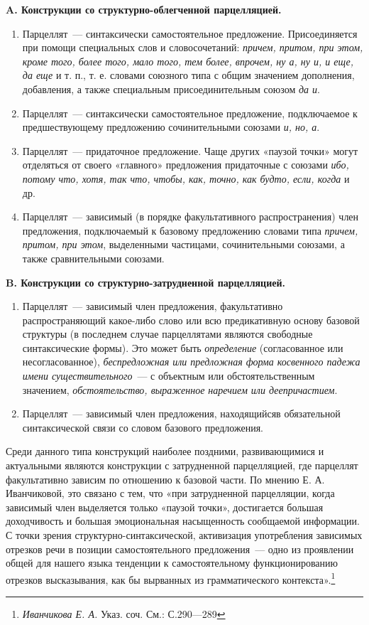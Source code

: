 \documentclass{kursa4}
\begin{document}
{      {\centering
      \textbf{A. Конструкции со структурно-облегченной парцелляцией.}}
      \begin{enumerate}
        \item Парцеллят~--- синтаксически самостоятельное предложение. Присоединяется при помощи специальных слов и словосочетаний: \textit{причем, притом, при этом, кроме того, более того, мало того, тем более, впрочем, ну а, ну и, и еще, да еще} и т. п., т. е. словами союзного типа с общим значением дополнения, добавления, а также специальным присоединительным союзом \textit{да и}. \item Парцеллят~--- синтаксически самостоятельное предложение, подключаемое к предшествующему предложению сочинительными союзами \textit{и, но, а}. \item Парцеллят~--- придаточное предложение. Чаще других «паузой точки» могут отделяться от своего «главного» предложения придаточные с союзами \textit{ибо, потому что, хотя, так что, чтобы, как, точно, как будто, если, когда}
        и др. \item Парцеллят~--- зависимый (в порядке факультативного распространения) член предложения, подключаемый к базовому предложению словами типа \textit{причем, притом, при этом}, выделенными частицами, сочинительными союзами, а также сравнительными союзами. \end{enumerate}

      {\centering\textbf{B. Конструкции со структурно-затрудненной парцелляцией.}}
      \begin{enumerate}
        \item {Парцеллят~--- зависимый член предложения, факультативно распространяющий какое-либо слово или всю предикативную основу базовой структуры (в последнем случае парцеллятами являются свободные синтаксические формы). Это может быть
        }\textit{определение}
        (согласованное или несогласованное), \textit{беспредложная или предложная форма косвенного падежа имени существительного}~--- с объектным или обстоятельственным значением, \textit{обстоятельство, выраженное наречием или деепричастием}. \item {Парцеллят~--- зависимый член предложения, находящийся}в обязательной синтаксической связи со словом базового предложения. \end{enumerate}

      Среди данного типа конструкций наиболее поздними, развивающимися и актуальными являются конструкции с затрудненной парцелляцией, где парцеллят факультативно зависим по отношению к базовой части. По мнению Е. А. Иванчиковой, это связано с тем, что «при затрудненной парцелляции, когда зависимый член выделяется только «паузой точки», достигается большая доходчивость и большая эмоциональная насыщенность сообщаемой информации. С точки зрения структурно-синтаксической, активизация употребления зависимых отрезков речи в позиции самостоятельного предложения~--- одно из проявлении общей для нашего языка тенденции к самостоятельному функционированию отрезков высказывания, как бы вырванных из грамматического контекста».\footnote{\textit{ Иванчикова Е. А. }{Указ. соч. См.: С.290—289}}

}
\end{document}

